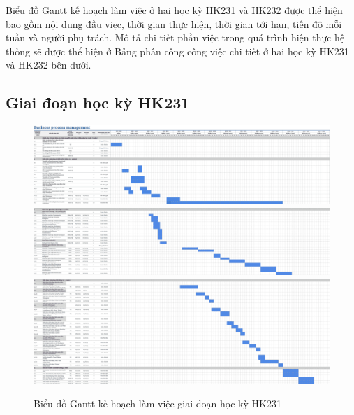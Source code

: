 
Biểu đồ Gantt kế hoạch làm việc ở hai học kỳ HK231 và HK232 được thể hiện bao gồm nội dung đầu viẹc, thời gian thực hiện, thời gian tới hạn, tiến độ mỗi tuần và người phụ trách. Mô tả chi tiết phần việc trong quá trình hiện thực hệ thống sẽ được thể hiện ở Bảng phân công công việc chi tiết ở hai học kỳ HK231 và HK232 bên dưới.

\subsection{Giai đoạn học kỳ HK231}

\begin{figure} [H]
    \centering
    \includegraphics[width = \linewidth]{Content/Giới thiệu đề tài/images/PCCV_HK231_1.png}
    \includegraphics[width = \linewidth]{Content/Giới thiệu đề tài/images/PCCV_HK231_2.png}
    \includegraphics[width = \linewidth]{Content/Giới thiệu đề tài/images/PCCV_HK231_3.png}
    \vspace{0.5cm}
    \caption{Biểu đồ Gantt kế hoạch làm việc giai đoạn học kỳ HK231}
    \label{fig:Biểu đồ Gantt kế hoạch làm việc giai đoạn học kỳ HK231}
\end{figure}

